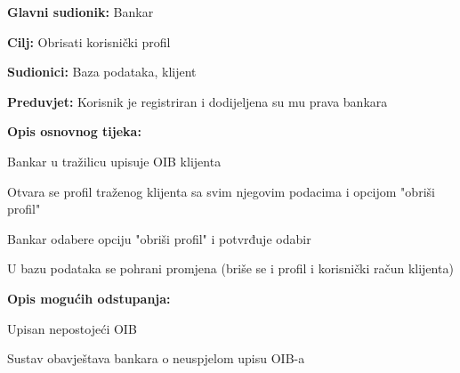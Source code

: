                 \noindent {}
                \begin{packed_item}
                
                  \item \textbf{Glavni sudionik: }Bankar
                  \item  \textbf{Cilj:} Obrisati korisnički profil 
                  \item  \textbf{Sudionici:} Baza podataka, klijent
                  \item  \textbf{Preduvjet:} Korisnik je registriran i dodijeljena su mu prava bankara 
                  \item  \textbf{Opis osnovnog tijeka:}
              
              \item[] \begin{packed_enum}
                
                    \item  Bankar u tražilicu upisuje OIB klijenta
                    \item  Otvara se profil traženog klijenta sa svim njegovim podacima i opcijom "obriši profil"
                    \item  Bankar odabere opciju "obriši profil" i potvrđuje odabir
                    \item  U bazu podataka se pohrani promjena (briše se i profil i korisnički račun klijenta)
                  \end{packed_enum}
                  
                  \item  \textbf{Opis mogućih odstupanja:}
                  
                  \item[] \begin{packed_enum}
                
                    \item[1.a] Upisan nepostojeći OIB
                    \item[] \begin{packed_enum}
                      
                      \item Sustav obavještava bankara o neuspjelom upisu OIB-a 
                
                    
                  \end{packed_enum}
                \end{packed_enum}
            \end{packed_item}
        
